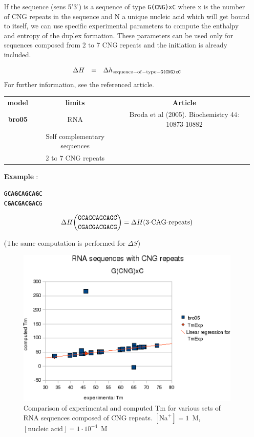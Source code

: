 \documentclass{article}
\begin{document}
If the sequence (sens 5'3') is a sequence of type \texttt{G(CNG)xC} where x is the number of CNG repeats in
the sequence and N a unique nucleic acid which will get bound to itself, we can use specific
experimental parameters to compute the enthalpy and entropy of the duplex formation. These parameters can be used
only for sequences composed from 2 to 7 CNG repeats and the initiation is already included.
 
\begin{displaymath}
  \begin{array}[t]{ccc}
  \Delta{}H&=&\Delta{}h_\mathrm{sequence-of-type-\texttt{G(CNG)xC}}\\
  \end{array}
\end{displaymath}
For further information, see the referenced article.

\begin{table}[h]
\begin{tabular}[h]{| c | c | c |}
\textbf{model} & \textbf{limits} & \textbf{Article} \\
\textbf{bro05} & RNA & Broda et al (2005). Biochemistry 44: 10873-10882 \\
 & Self complementary sequences & \\
 & 2 to 7 CNG repeats & \\
\end{tabular}
\end{table}


\textbf{Example} :
\begin{alltt}
G\textbf{CAGCAGCAG}C
C\textbf{GACGACGAC}G
\end{alltt}

\begin{multline*}
\Delta H {\mbox{\texttt{GCAGCAGCAGC}} \choose \mbox{\texttt{CGACGACGACG}}} = 
\Delta H {(\mbox{3-CAG-repeats})}
\end{multline*}

       (The same computation is performed for $\Delta S$)

\begin{figure}[h]
\includegraphics{images/CNG.eps}
\caption{Comparison of experimental and computed Tm for various sets of
 RNA sequences composed of CNG repeats. $[\mbox{Na}^+] = 1$~M, $[\mbox{nucleic acid}] = 1\cdot{}10^{-4}$~M}
\end{figure}
\end{document}
